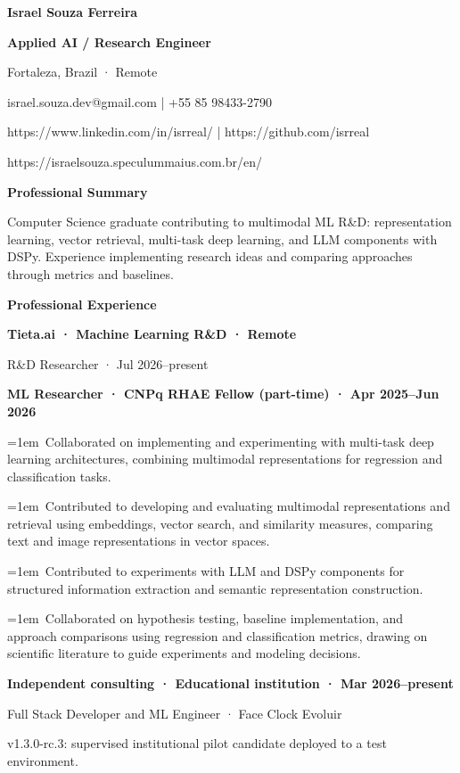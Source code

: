 \documentclass[a4paper,10pt]{article}
\begin{document}
\textbf{Israel Souza Ferreira}\par
\textbf{Applied AI / Research Engineer}\par
Fortaleza, Brazil · Remote\par
israel.souza.dev@gmail.com | +55 85 98433-2790\par
https://www.linkedin.com/in/isrreal/ | https://github.com/isrreal\par
https://israelsouza.speculummaius.com.br/en/\par
\vspace{5pt}\textbf{Professional Summary}\par
Computer Science graduate contributing to multimodal ML R\&D: representation learning, vector retrieval, multi-task deep learning, and LLM components with DSPy. Experience implementing research ideas and comparing approaches through metrics and baselines.\par
\vspace{5pt}\textbf{Professional Experience}\par
\textbf{Tieta.ai · Machine Learning R\&D · Remote}\par
R\&D Researcher · Jul 2026–present\par
\textbf{ML Researcher · CNPq RHAE Fellow (part-time) · Apr 2025–Jun 2026}\par
\hangindent=1em\textbullet\ Collaborated on implementing and experimenting with multi-task deep learning architectures, combining multimodal representations for regression and classification tasks.\par
\hangindent=1em\textbullet\ Contributed to developing and evaluating multimodal representations and retrieval using embeddings, vector search, and similarity measures, comparing text and image representations in vector spaces.\par
\hangindent=1em\textbullet\ Contributed to experiments with LLM and DSPy components for structured information extraction and semantic representation construction.\par
\hangindent=1em\textbullet\ Collaborated on hypothesis testing, baseline implementation, and approach comparisons using regression and classification metrics, drawing on scientific literature to guide experiments and modeling decisions.\par
\textbf{Independent consulting · Educational institution · Mar 2026–present}\par
Full Stack Developer and ML Engineer · Face Clock Evoluir\par
v1.3.0-rc.3: supervised institutional pilot candidate deployed to a test environment.\par
\end{document}
